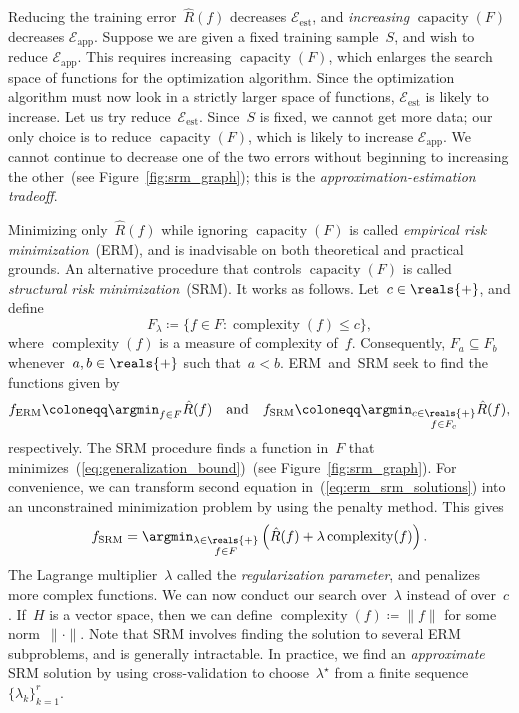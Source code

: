 \documentclass[11pt,a4paper]{article}
\numberwithin{equation}{section}
\newcommand{\capacity}{\operatorname{capacity}}
\newcommand{\complexity}{\operatorname{complexity}}
\newcommand{\apperr}{\mathcal{E}_{\mathrm{app}}}
\newcommand{\esterr}{\mathcal{E}_{\mathrm{est}}}
\begin{document}
Reducing the training error~$\hat{R}(f)$ decreases $\esterr$, and
\emph{increasing} $\capacity(F)$ decreases $\apperr$. Suppose we are given a
fixed training sample~$S$, and wish to reduce $\apperr$. This requires
increasing $\capacity(F)$, which enlarges the search space of functions for the
optimization algorithm. Since the optimization algorithm must now look in a
strictly larger space of functions, $\esterr$ is likely to increase. Let us try
reduce~$\esterr$. Since~$S$ is fixed, we cannot get more data; our only choice
is to reduce $\capacity(F)$, which is likely to increase $\apperr$. We cannot
continue to decrease one of the two errors without beginning to increasing the
other~(see Figure~\ref{fig:srm_graph}); this is the
\emph{approximation-estimation tradeoff}.

Minimizing only~$\hat{R}(f)$ while ignoring $\capacity(F)$ is called
\emph{empirical risk minimization}~(ERM), and is inadvisable on both theoretical
and practical grounds. An alternative procedure that controls $\capacity(F)$ is
called \emph{structural risk minimization}~(SRM). It works as follows. Let~$c
\in \reals{+}$, and define
\begin{equation}
	F_\lambda \coloneqq \{ f \in F : \complexity(f) \leq c \},
	\label{eq:regularized_family}
\end{equation}
where $\complexity(f)$ is a measure of complexity of~$f$. Consequently, $F_a
\subseteq F_b$ whenever~$a, b \in \reals{+}$ such that~$a < b$. ERM~and~SRM seek
to find the functions given by
\begin{equation}
	f_{\text{ERM}} \coloneqq \argmin_{f \in F} \hat{R}(f)
	\quad\text{and}\quad
	f_{\text{SRM}} \coloneqq \argmin_{\substack{c \in \reals{+} \\ f \in F_c}}
		\hat{R}(f),
	\label{eq:erm_srm_solutions}
\end{equation}
respectively. The SRM procedure finds a function in~$F$ that
minimizes~(\ref{eq:generalization_bound})~(see Figure~\ref{fig:srm_graph}). For
convenience, we can transform second equation in~(\ref{eq:erm_srm_solutions})
into an unconstrained minimization problem by using the penalty method. This
gives
\begin{equation}
	f_{\text{SRM}} = \argmin_{\substack{\lambda \in \reals{+} \\ f \in F}}
		\left(\hat{R}(f) + \lambda\complexity(f)\right).
	\label{eq:srm_penalty}
\end{equation}
The Lagrange multiplier~$\lambda$ called the \emph{regularization parameter},
and penalizes more complex functions. We can now conduct our search
over~$\lambda$ instead of over~$c$. If~$H$ is a vector space, then we can define
$\complexity(f) \coloneqq \|f\|$ for some norm~${\|\cdot\|}$. Note that SRM
involves finding the solution to several ERM subproblems, and is generally
intractable. In practice, we find an \emph{approximate} SRM solution by using
cross-validation to choose~$\lambda^\star$ from a finite sequence~$\{ \lambda_k
\}_{k = 1}^r$.
\end{document}
